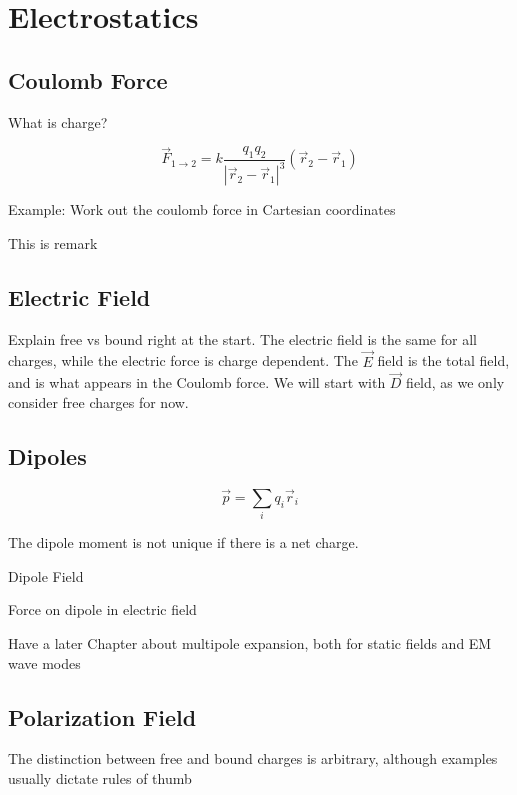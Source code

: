 \documentclass[12pt,a4paper,violet]{bbe}
\begin{document}
\chapter{Electrostatics}
\section{Coulomb Force}
What is charge?

\begin{definition}
	$$ \vec{F}_{1 \rightarrow 2} = k \frac{q_1 q_2}{|\vec{r}_2 - \vec{r}_1|^3} (\vec{r}_2 - \vec{r}_1)$$
\end{definition}

Example: Work out the coulomb force in Cartesian coordinates

\begin{remark}
	This is remark
\end{remark}

\section{Electric Field}
Explain free vs bound right at the start. The electric field is the same for all charges, while the electric force is charge dependent. The $\Vec{E}$ field is the total field, and is what appears in the Coulomb force.
We will start with $\Vec{D}$ field, as we only consider free charges for now.

\section{Dipoles}

\begin{definition}
	$$ \vec{p} = \sum_i q_i \vec{r}_i$$
\end{definition}

The dipole moment is not unique if there is a net charge.

Dipole Field

Force on dipole in electric field

Have a later Chapter about multipole expansion, both for static fields and EM wave modes


\section{Polarization Field}
\begin{remark}
	The distinction between free and bound charges is arbitrary, although examples usually dictate rules of thumb
\end{remark}
\end{document}
